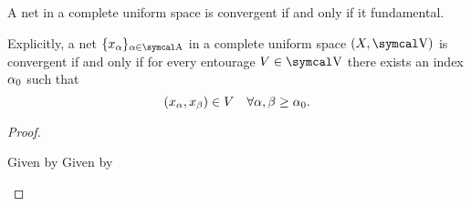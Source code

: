 \begin{theorem}\label{thm:cauchys_net_convergence_criterion}
  A net in a complete uniform space is convergent if and only if it fundamental.

  Explicitly, a net \( \{ x_\al \}_{\al \in \CA} \) in a complete uniform space \( (X, \CV) \) is convergent if and only if for every entourage \( V \in \CV \) there exists an index \( \alpha_0 \) such that
  \begin{equation*}
    (x_\alpha, x_\beta) \in V \quad\forall \alpha, \beta \geq \alpha_0.
  \end{equation*}
\end{theorem}
\begin{proof}\mbox{}
  \begin{description}
    \Implies Given by 
    \ImpliedBy Given by 
  \end{description}
\end{proof}
